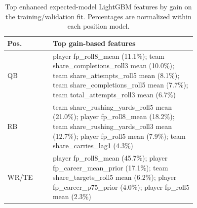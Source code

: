 \begin{table}[!htbp]
\caption{Top enhanced expected-model LightGBM features by gain on the training/validation fit. Percentages are normalized within each position model.}
\label{tab:importance}
\centering
\footnotesize
\begin{tabular}{lp{0.76\linewidth}}
\toprule
Pos. & Top gain-based features \\
\midrule
QB & player fp\_roll8\_mean (11.1\%); team share\_completions\_roll3 mean (10.0\%); team share\_attempts\_roll5 mean (8.1\%); team share\_completions\_roll5 mean (7.7\%); team total\_attempts\_roll3 mean (6.7\%) \\
RB & team share\_rushing\_yards\_roll5 mean (21.0\%); player fp\_roll8\_mean (18.2\%); team share\_rushing\_yards\_roll3 mean (12.7\%); player fp\_roll5 mean (7.9\%); team share\_carries\_lag1 (4.3\%) \\
WR/TE & player fp\_roll8\_mean (45.7\%); player fp\_career\_mean\_prior (17.1\%); team share\_targets\_roll5 mean (6.2\%); player fp\_career\_p75\_prior (4.0\%); player fp\_roll5 mean (2.3\%) \\
\bottomrule
\end{tabular}
\end{table}
